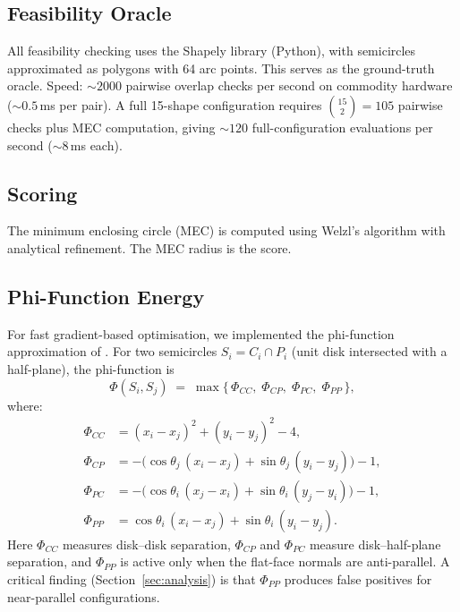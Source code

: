 \documentclass[11pt]{article}
\begin{document}
\subsection{Feasibility Oracle}
\label{sec:oracle}

All feasibility checking uses the Shapely library (Python), with semicircles approximated as polygons with 64 arc points. This serves as the ground-truth oracle. Speed: ${\sim}2000$ pairwise overlap checks per second on commodity hardware (${\sim}0.5$\,ms per pair). A full 15-shape configuration requires $\binom{15}{2} = 105$ pairwise checks plus MEC computation, giving ${\sim}120$ full-configuration evaluations per second (${\sim}8$\,ms each).

\subsection{Scoring}

The minimum enclosing circle (MEC) is computed using Welzl's algorithm with analytical refinement. The MEC radius is the score.

\subsection{Phi-Function Energy}
\label{sec:phi}

For fast gradient-based optimisation, we implemented the phi-function approximation of \citet{chernov2012}. For two semicircles $S_i = C_i \cap P_i$ (unit disk intersected with a half-plane), the phi-function is
\begin{equation}
  \Phi(S_i, S_j) \;=\; \max\!\bigl\{\,\Phi_{CC},\;\Phi_{CP},\;\Phi_{PC},\;\Phi_{PP}\,\bigr\},
  \label{eq:phi}
\end{equation}
where:
\begin{align}
  \Phi_{CC} &= (x_i - x_j)^2 + (y_i - y_j)^2 - 4, \label{eq:phiCC}\\
  \Phi_{CP} &= -\bigl(\cos\theta_j\,(x_i - x_j) + \sin\theta_j\,(y_i - y_j)\bigr) - 1, \label{eq:phiCP}\\
  \Phi_{PC} &= -\bigl(\cos\theta_i\,(x_j - x_i) + \sin\theta_i\,(y_j - y_i)\bigr) - 1, \label{eq:phiPC}\\
  \Phi_{PP} &= \cos\theta_i\,(x_i - x_j) + \sin\theta_i\,(y_i - y_j). \label{eq:phiPP}
\end{align}
Here $\Phi_{CC}$ measures disk--disk separation, $\Phi_{CP}$ and $\Phi_{PC}$ measure disk--half-plane separation, and $\Phi_{PP}$ is active only when the flat-face normals are anti-parallel. A critical finding (Section~\ref{sec:analysis}) is that $\Phi_{PP}$ produces false positives for near-parallel configurations.
\end{document}
